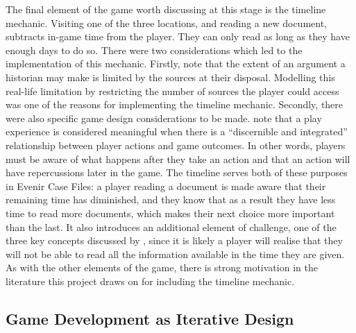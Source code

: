 \documentclass{l4proj}
\begin{document}
The final element of the game worth discussing at this stage is the timeline mechanic. Visiting one of the three locations, and reading a new document, subtracts in-game time from the player. They can only read as long as they have enough days to do so. There were two considerations which led to the implementation of this mechanic. Firstly, \citet{tosh2006pursuit} note that the extent of an argument a historian may make is limited by the sources at their disposal. Modelling this real-life limitation by restricting the number of sources the player could access was one of the reasons for implementing the timeline mechanic. Secondly, there were also specific game design considerations to be made. \citet{salen2004rules} note that a play experience is considered meaningful when there is a “discernible and integrated” relationship between player actions and game outcomes. In other words, players must be aware of what happens after they take an action and that an action will have repercussions later in the game. The timeline serves both of these purposes in Evenir Case Files: a player reading a document is made aware that their remaining time has diminished, and they know that as a result they have less time to read more documents, which makes their next choice more important than the last. It also introduces an additional element of challenge, one of the three key concepts discussed by \citet{malone1980makes}, since it is likely a player will realise that they will not be able to read all the information available in the time they are given. As with the other elements of the game, there is strong motivation in the literature this project draws on for including the timeline mechanic. 

\subsection{Game Development as Iterative Design}
\end{document}
